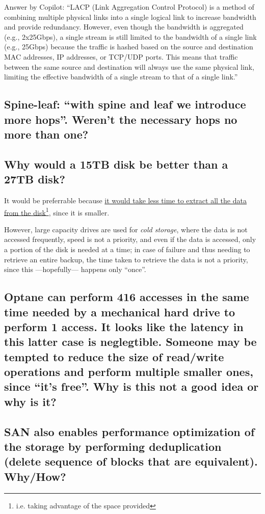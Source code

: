 Answer by Copilot: 
``LACP (Link Aggregation Control Protocol) is a method of combining multiple physical links into a single logical link to increase bandwidth and provide redundancy. However, even though the bandwidth is aggregated (e.g., 2x25Gbps), a single stream is still limited to the bandwidth of a single link (e.g., 25Gbps) because the traffic is hashed based on the source and destination MAC addresses, IP addresses, or TCP/UDP ports. This means that traffic between the same source and destination will always use the same physical link, limiting the effective bandwidth of a single stream to that of a single link.''

\subsection{Spine-leaf: ``with spine and leaf we introduce \textbf{more hops}''. Weren't the necessary hops no more than one?}

\subsection{Why would a 15TB disk be better than a 27TB disk?}
It would be preferrable because \ul{it would take less time to extract all the data from the disk}\footnote{i.e. taking advantage of the space provided}, since it is smaller.

However, large capacity drives are used for \textit{cold storage}, where the data is not accessed frequently, speed is not a priority, and even if the data is accessed, only a portion of the disk is needed at a time; in case of failure and thus needing to retrieve an entire backup, the time taken to retrieve the data is not a priority, since this ---hopefully--- happens only ``once''.

\subsection{Optane can perform 416 accesses in the same time needed by a mechanical hard drive to perform 1 access. It looks like the latency in this latter case is neglegtible. Someone may be tempted to reduce the size of read/write operations and perform multiple smaller ones, since ``it's free''. Why is this not a good idea or why is it?}

\subsection{SAN also enables performance optimization of the storage by performing
deduplication (delete sequence of blocks that are equivalent). Why/How?}

